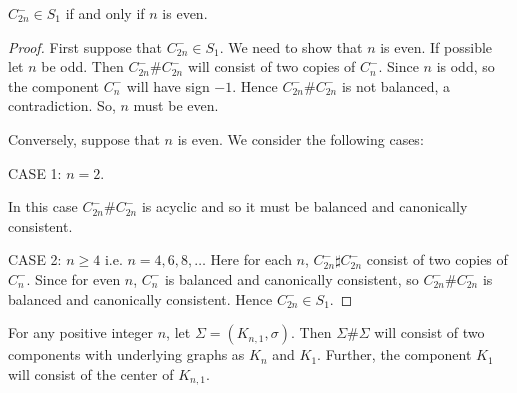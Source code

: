 \begin{proposition}
$C^-_{2n}\in S_1$ if and only if $n$ is even.
\end{proposition}
\begin{proof}
First suppose that $C^-_{2n}\in S_1$. We need to show that $n$ is even. 
If possible let $n$ be odd. Then $C^-_{2n}\# C^-_{2n}$ will consist of two copies of $C^-_n$. Since $n$ is odd, so the component $C^-_{n}$ 
will have sign $-1$.
Hence $C^-_{2n}\# C^-_{2n}$ is not balanced, a contradiction. So, $n$ must be even.

Conversely, suppose that $n$ is even. We consider the following cases:

CASE 1: $n= 2$. 

In this case $C^-_{2n}\# C^-_{2n}$ is acyclic and so it must be balanced and canonically consistent.

% 
% 
% 
% 
% 


CASE 2: $n\geq 4$ i.e. $n= 4,6,8,\ldots$
Here for each $n$, $C^-_{2n}\sharp C^-_{2n}$ consist of two copies of $C^-_n$. Since for even $n$, $C^-_n$ is balanced and canonically consistent,
so $C^-_{2n}\# C^-_{2n}$ is balanced and canonically consistent. Hence $C^-_{2n}\in S_1$.
\end{proof}
\remark For any positive integer $n$, let $\Sigma=(K_{n,1},\sigma)$. Then $\Sigma\# \Sigma$ will consist of two components with 
underlying graphs
 as $K_{n}$ and $K_1$. Further, the component $K_1$ will consist of the center of $K_{n,1}$.

